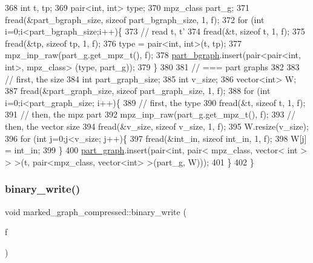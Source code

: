 \begin{DoxyCode}
368   \textcolor{keywordtype}{int} t, tp;
369   pair<int, int> type; 
370   mpz\_class part\_g; 
371   fread(&part\_bgraph\_size, \textcolor{keyword}{sizeof} part\_bgraph\_size, 1, f);
372   \textcolor{keywordflow}{for} (\textcolor{keywordtype}{int} i=0;i<part\_bgraph\_size;i++)\{
373     \textcolor{comment}{// read t, t'}
374     fread(&t, \textcolor{keyword}{sizeof} t, 1, f);
375     fread(&tp, \textcolor{keyword}{sizeof} tp, 1, f);
376     type = pair<int, int>(t, tp);
377     mpz\_inp\_raw(part\_g.get\_mpz\_t(), f);
378     \hyperlink{classmarked__graph__compressed_a7b3267063fba30b45eb21b3ba4e07536}{part\_bgraph}.insert(pair<pair<int, int>, mpz\_class> (type, part\_g));
379   \}
380 
381   \textcolor{comment}{// === part graphs}
382 
383   \textcolor{comment}{// first, the size}
384   \textcolor{keywordtype}{int} part\_graph\_size;
385   \textcolor{keywordtype}{int} v\_size;
386   vector<int> W; 
387   fread(&part\_graph\_size, \textcolor{keyword}{sizeof} part\_graph\_size, 1, f);
388   \textcolor{keywordflow}{for} (\textcolor{keywordtype}{int} i=0;i<part\_graph\_size; i++)\{
389     \textcolor{comment}{// first, the type}
390     fread(&t, \textcolor{keyword}{sizeof} t, 1, f);
391     \textcolor{comment}{// then, the mpz part}
392     mpz\_inp\_raw(part\_g.get\_mpz\_t(), f);
393     \textcolor{comment}{// then, the vector size}
394     fread(&v\_size, \textcolor{keyword}{sizeof} v\_size, 1, f);
395     W.resize(v\_size);
396     \textcolor{keywordflow}{for} (\textcolor{keywordtype}{int} j=0;j<v\_size; j++)\{
397       fread(&int\_in, \textcolor{keyword}{sizeof} int\_in, 1, f);
398       W[j] = int\_in;
399     \}
400     \hyperlink{classmarked__graph__compressed_ae179a4737e6eab905c18a94d44ef64b7}{part\_graph}.insert(pair<\textcolor{keywordtype}{int}, pair< mpz\_class, vector< int > > >(t, pair<mpz\_class, vector<int>
       >(part\_g, W)));
401   \}
402 \}
\end{DoxyCode}
\mbox{\label{classmarked__graph__compressed_ab9cdb7fc43badd58fb5202f74ffac723}} 
\subsubsection{\texorpdfstring{binary\+\_\+write()}{binary\_write()}}
{\footnotesize\ttfamily void marked\+\_\+graph\+\_\+compressed\+::binary\+\_\+write (\begin{DoxyParamCaption}\item[{F\+I\+LE $\ast$}]{f }\end{DoxyParamCaption})}



